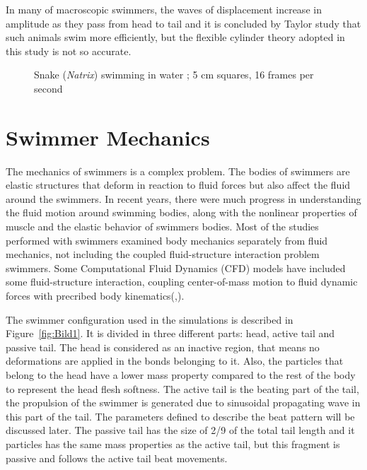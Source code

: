 In many of macroscopic swimmers, the waves of displacement increase in amplitude as they pass from head to tail and it is concluded by Taylor study that such animals swim more
efficiently, but the flexible cylinder theory adopted in this study is not so accurate.


\begin{figure}[H]
\centering
  \begin{footnotesize}
  
  \caption[Snake (\textit{Natrix}) swimming in water ; 5 cm squares, 16 frames per second \cite{taylor_analysis_1952}]{Snake (\textit{Natrix}) swimming in water ; 5 cm squares, 16 frames per second \cite{taylor_analysis_1952}}
  \label{fig:Bild2.2}
  \end{footnotesize}
\end{figure} 



\section{Swimmer Mechanics}
\label{sec:section 2}
The mechanics of swimmers is a complex problem\cite{tytell_interactions_2010}. The bodies of swimmers are elastic structures that deform in reaction to fluid forces but also affect the fluid around the swimmers.
In recent years, there were much progress in understanding the fluid motion around swimming bodies\cite{shadwick_fish_2006}, along with the nonlinear properties of muscle\cite{williams_new_2010} and the elastic behavior of 
swimmers bodies\cite{williams_new_2010}. Most of the studies performed with swimmers examined body mechanics separately from fluid mechanics, not including the coupled
fluid-structure interaction problem swimmers. Some Computational Fluid Dynamics (CFD) models have included some fluid-structure interaction, coupling center-of-mass motion to 
fluid dynamic forces with precribed body kinematics(\cite{kern_simulations_2006},\cite{borazjani_role_2010}).

\par

The swimmer configuration used in the simulations is described in Figure~\ref{fig:Bild1}. It is divided in three different parts: head, active tail and passive tail. The head 
is considered as an inactive region, that means no deformations are applied in the bonds belonging to it. Also, the particles that belong to the head have a lower mass property
compared to the rest of the body to represent the head flesh softness. The active tail is the beating part of the tail, the propulsion of the swimmer is generated due to sinusoidal 
propagating wave in this part of the tail. The parameters defined to describe the beat pattern will be discussed later. The passive tail has the size of 2/9 of the total tail length
and it particles has the same mass properties as the active tail, but this fragment is passive and follows the active tail beat movements. 


